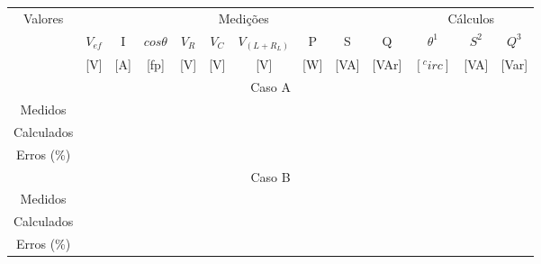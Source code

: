 \documentclass[a4paper,12pt,oneside,openany,table,xcdraw]{article}
\begin{document}
\begin{enumerate}[1 - ]
\begin{table}[h]
\centering
\def\arraystretch{1.35}
 \label{tab2}
\begin{tabular}{|c|c|c|c|c|c|c|c|c|c|c|c|c|}
\hline
\multirow{3}{*}{Valores} & \multicolumn{9}{c|}{Medições}                                                                         & \multicolumn{3}{c|}{Cálculos}     \\ \cline{2-13} 
                         & $V_{ef}$ & I       & $cos\theta$ & $V_R$   & $V_C$   & $V_{(L+R_L)}$ & P       & S        & Q         & $\theta^1$ & $S^2$    & $Q^3$     \\ \cline{2-13} 
                         & {[}V{]}  & {[}A{]} & {[}fp{]}    & {[}V{]} & {[}V{]} & {[}V{]}       & {[}W{]} & {[}VA{]} & {[}VAr{]} & $[^circ]$  & {[}VA{]} & {[}Var{]} \\ \hline
\multicolumn{13}{|c|}{Caso A}                                                                                                                                        \\ \hline
Medidos                  &          &         &             &         &         &               &         &          &           &            &          &           \\ \hline
Calculados               &          &         &             &         &         &               &         &          &           &            &          &           \\ \hline
Erros (\%)               &          &         &             &         &         &               &         &          &           &            &          &           \\ \hline
\multicolumn{13}{|c|}{Caso B}                                                                                                                                        \\ \hline
Medidos                  &          &         &             &         &         &               &         &          &           &            &          &           \\ \hline
Calculados               &          &         &             &         &         &               &         &          &           &            &          &           \\ \hline
Erros (\%)               &          &         &             &         &         &               &         &          &           &            &          &           \\ \hline
\end{tabular}

\end{table}

\end{enumerate}
\end{document}
